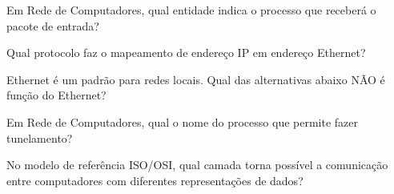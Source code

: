 \documentclass[10pt,a4paper]{article}
\begin{document}
%
{
\def\AMCbeginQuestion#1#2{\par\noindent{\bf (POSCOMP 2017 - Questão 54)}}
\begin{question}{} Em Rede de Computadores, qual entidade indica o processo que receberá o pacote de entrada?
\begin{choices}
\end{choices}
\end{question}
}
%
{
\def\AMCbeginQuestion#1#2{\par\noindent{\bf (POSCOMP 2017 - Questão 60)}}
\begin{question}{} Qual protocolo faz o mapeamento de endereço IP em endereço Ethernet?
\begin{choices}
\end{choices}
\end{question}
}
%
{
\def\AMCbeginQuestion#1#2{\par\noindent{\bf (POSCOMP 2017 - Questão 65)}}
\begin{question}{} Ethernet é um padrão para redes locais. Qual das alternativas abaixo NÃO é função do Ethernet?
\begin{choices}
\end{choices}
\end{question}
}
%
{
\def\AMCbeginQuestion#1#2{\par\noindent{\bf (POSCOMP 2018 - Questão 54)}}
\begin{question}{} Em Rede de Computadores, qual o nome do processo que permite fazer tunelamento?
\begin{choices}
\end{choices}
\end{question}
}
%
{
\def\AMCbeginQuestion#1#2{\par\noindent{\bf (POSCOMP 2018 - Questão 60)}}
\begin{question}{} No modelo de referência ISO/OSI, qual camada torna possível a comunicação entre computadores com diferentes representações de dados?
\begin{choices}
\end{choices}
\end{question}
}
\end{document}

